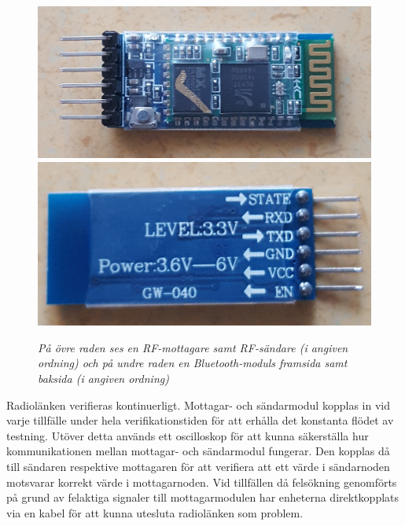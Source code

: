 \documentclass[a4paper]{article}
\begin{document}
\begin{figure}[H]
\includegraphics[scale=0.07]{BluetoothFront.jpg}
\includegraphics[scale=0.078]{BluetoothBack.jpg}

\caption{\it På övre raden ses en RF-mottagare samt RF-sändare (i angiven ordning) och på undre raden en Bluetooth-moduls framsida samt baksida (i angiven ordning)}
\end{figure} 




\vspace{5mm} \noindent
Radiolänken verifieras kontinuerligt. Mottagar- och sändarmodul kopplas in vid varje tillfälle under hela verifikationstiden för att erhålla det konstanta flödet av testning. Utöver detta används ett oscilloskop för att kunna säkerställa hur kommunikationen mellan mottagar- och sändarmodul fungerar. Den kopplas då till sändaren respektive mottagaren för att verifiera att ett värde i sändarnoden motsvarar korrekt värde i mottagarnoden. Vid tillfällen då felsökning genomförts på grund av felaktiga signaler till mottagarmodulen har enheterna direktkopplats via en kabel för att kunna utesluta radiolänken som problem.
\end{document}
